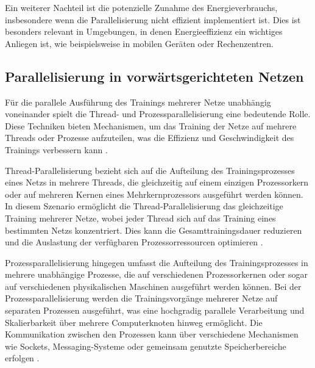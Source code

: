 Ein weiterer Nachteil ist die potenzielle Zunahme des Energieverbrauchs, insbesondere wenn die Parallelisierung nicht effizient implementiert ist. Dies ist besonders relevant in Umgebungen, in denen Energieeffizienz ein wichtiges Anliegen ist, wie beispielsweise in mobilen Geräten oder Rechenzentren.

\subsection{Parallelisierung in vorwärtsgerichteten Netzen}
\label{sec:Grundlagen_Parallelisierung_Neuronale_Netze}
Für die parallele Ausführung des Trainings mehrerer Netze unabhängig voneinander spielt die Thread- und Prozessparallelisierung eine bedeutende Rolle. Diese Techniken bieten Mechanismen, um das Training der Netze auf mehrere Threads oder Prozesse aufzuteilen, was die Effizienz und Geschwindigkeit des Trainings verbessern kann \citep{Flynn_Computer_Organizations_and_their_Effectiveness}.

Thread-Parallelisierung bezieht sich auf die Aufteilung des Trainingsprozesses eines Netzs in mehrere Threads, die gleichzeitig auf einem einzigen Prozessorkern oder auf mehreren Kernen eines Mehrkernprozessors ausgeführt werden können. In diesem Szenario ermöglicht die Thread-Parallelisierung das gleichzeitige Training mehrerer Netze, wobei jeder Thread sich auf das Training eines bestimmten Netzs konzentriert. Dies kann die Gesamttrainingsdauer reduzieren und die Auslastung der verfügbaren Prozessorressourcen optimieren \citep{Flynn_Computer_Organizations_and_their_Effectiveness}.

Prozessparallelisierung hingegen umfasst die Aufteilung des Trainingsprozesses in mehrere unabhängige Prozesse, die auf verschiedenen Prozessorkernen oder sogar auf verschiedenen physikalischen Maschinen ausgeführt werden können. Bei der Prozessparallelisierung werden die Trainingsvorgänge mehrerer Netze auf separaten Prozessen ausgeführt, was eine hochgradig parallele Verarbeitung und Skalierbarkeit über mehrere Computerknoten hinweg ermöglicht. Die Kommunikation zwischen den Prozessen kann über verschiedene Mechanismen wie Sockets, Messaging-Systeme oder gemeinsam genutzte Speicherbereiche erfolgen \citep{Flynn_Computer_Organizations_and_their_Effectiveness}.

